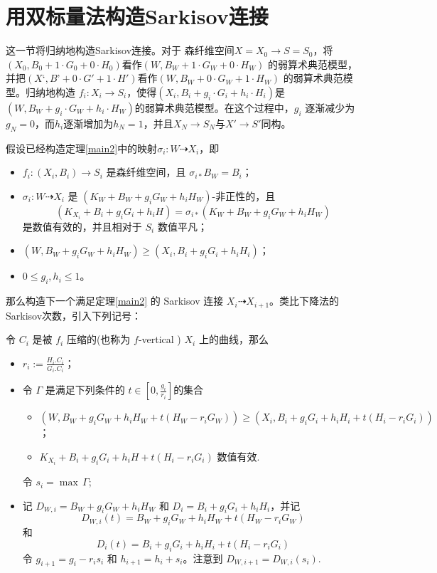 \section{用双标量法构造Sarkisov连接}
这一节将归纳地构造Sarkisov连接。对于 森纤维空间$X=X_{0}\to S=S_{0}$，将$(X_{0},B_{0}+1\cdot G_{0}+0\cdot H_{0}) $看作$(W,B_{W}+1\cdot G_{W}+0\cdot H_{W}) $ 的弱算术典范模型，并把$(X‘,B’+0\cdot G'+1\cdot H') $看作$(W,B_{W}+0\cdot G_{W}+1\cdot H_{W}) $ 的弱算术典范模型。归纳地构造  $f_{i}:X_{i}\to S_{i}$，使得$(X_{i},B_{i}+g_{i}\cdot G_{i}+h_{i}\cdot H_{i}) $是$(W,B_{W}+g_{i}\cdot G_{W}+h_{i}\cdot H_{W}) $的弱算术典范模型。在这个过程中，$g_{i}$ 逐渐减少为$g_{N}=0$，而$h_{i}$逐渐增加为$h_{N}=1$，并且$X_{N}\to S_{N}$与$X'\to S'$同构。

假设已经构造定理\ref{main2}中的映射$\sigma_{i}:W\dashrightarrow X_{i}$，即
\begin{itemize}
  \item $f_{i}:(X_{i},B_{i})\to S_{i}$ 是森纤维空间，且 $\sigma_{i*} B_{W}=B_{i}$；
  \item $\sigma_{i}:W\dashrightarrow  X_{i}$ 是 $(K_{W}+B_{W}+g_{i}G_{W}+h_{i}H_{W})$-非正性的，且
    \[(K_{X_{i}}+B_{i}+g_{i}G_{i}+h_{i}H)=\sigma_{i*}(K_{W}+B_{W}+g_{i}G_{W}+h_{i}H_{W}) \]
    是数值有效的，并且相对于 $S_{i}$ 数值平凡；
  \item $(W,B_{W}+g_{i}G_{W}+h_{i}H_{W})\geqslant (X_{i},B_{i}+g_{i}G_{i}+h_{i}H_{i})$；
  \item $0\leqslant g_{i},h_{i}\leqslant 1$。
\end{itemize}
那么构造下一个满足定理\ref{main2} 的 Sarkisov 连接 $X_{i}\dashrightarrow X_{i+1}$。类比下降法的Sarkisov次数，引入下列记号：
\begin{definition}\label{doubledegree}
  令 $C_{i}$ 是被 $f_{i}$ 压缩的(也称为 $f$-vertical  )  $X_{i}$ 上的曲线，那么
  \begin{itemize}
    \item $r_{i}:=\frac{H_{i}.C_{i}}{G_{i}.C_{i}}$；
    \item 令 $\Gamma$ 是满足下列条件的 $t\in [0,\frac{g_{i}}{r_{i}}] $的集合
      \begin{itemize}
        \item\label{singularcondition} $\left(W,B_{W}+g_{i}G_{W}+h_{i}H_{W}+t(H_{W}-r_{i}G_{W})\right)\geqslant \left(X_{i},B_{i}+g_{i}G_{i}+h_{i}H_{i}+t\left(H_{i}-r_{i}G_{i}\right)\right)$；
        \item $K_{X_{i}}+B_{i}+g_{i}G_i+h_{i}H+t(H_{i}-r_{i}G_{i})$  数值有效.
      \end{itemize}
          令 $s_{i}=\max\, \Gamma $;
    \item 记 $D_{W,i}=B_{W}+g_{i}G_{W}+h_{i}H_{W}$ 和 $D_{i}=B_{i}+g_{i}G_{i}+h_{i}H_{i}$，并记
      \[D_{W,i}(t)=B_{W}+g_{i}G_{W}+h_{i}H_{W}+t(H_{W}-r_{i}G_{W})\]
      和
      \[D_{i}(t)=B_{i}+g_{i}G_{i}+h_{i}H_{i}+t (H_{i}-r_{i}G_{i})\]
      令 $g_{i+1}=g_{i}-r_{i}s_{i}$ 和 $h_{i+1}=h_{i}+s_{i}$。注意到 $D_{W,i+1}=D_{W,i}(s_{i})$.
  \end{itemize}
\end{definition}
